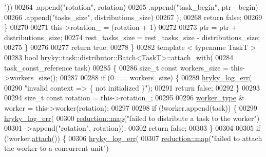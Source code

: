 \begin{DoxyCode}
{      "}))
00264                 .append(\textcolor{stringliteral}{"rotation"}, rotation)
00265                 .append(\textcolor{stringliteral}{"task\_begin"}, ptr - begin)
00266                 .append(\textcolor{stringliteral}{"tasks\_size"}, distributions\_size)
00267                 );
00268             \textcolor{keywordflow}{return} \textcolor{keyword}{false};
00269         \}
00270 
00271         this->rotation\_ = (rotation + 1) %
00272 
00273         ptr = ptr + distributions\_size;
00274         rest\_tasks\_size = rest\_tasks\_size - distributions\_size;
00275     \}
00276 
00277     \textcolor{keywordflow}{return} \textcolor{keyword}{true};
00278 \}
00282 \textcolor{keyword}{template} < \textcolor{keyword}{typename} TaskT >
\hypertarget{task__distributor__batch_8h_source_l00283}{}\hyperlink{group__task_ga54ecf037362d5f476c1cd9a984c1b720}{00283} \textcolor{keywordtype}{bool} \hyperlink{classhryky_1_1task_1_1distributor_1_1_batch}{hryky::task::distributor::Batch<TaskT>::attach_with}(
00284     task\_const\_reference task)
00285 \{
00286     \textcolor{keywordtype}{size\_t} \textcolor{keyword}{const} workers\_size = this->workers\_size();
00287 
00288     \textcolor{keywordflow}{if} (0 == workers\_size) \{
00289         \hyperlink{log__writer__common_8h_ae5ad3dabb33f594695ef40753cb78aad}{hryky_log_err}(
00290             \textcolor{stringliteral}{"invalid context => \{ not initialized \}"});
00291         \textcolor{keywordflow}{return} \textcolor{keyword}{false};
00292     \}
00293 
00294     \textcolor{keywordtype}{size\_t} \textcolor{keyword}{const} rotation = this->rotation\_;
00295 
00296     \hyperlink{classhryky_1_1task_1_1worker_1_1_base}{worker_type} & worker = this->worker(rotation);
00297 
00298     \textcolor{keywordflow}{if} (!worker.append(task)) \{
00299         \hyperlink{log__writer__common_8h_ae5ad3dabb33f594695ef40753cb78aad}{hryky_log_err}(
00300             \hyperlink{namespacehryky_1_1reduction_ac5eae270cf8047b294dc4ff3e5e11a79}{reduction::map}(\textcolor{stringliteral}{"failed to distribute a task to the worker"})
00301             ->append(\textcolor{stringliteral}{"rotation"}, rotation));
00302         \textcolor{keywordflow}{return} \textcolor{keyword}{false};
00303     \}
00304 
00305     \textcolor{keywordflow}{if} (!worker.\hyperlink{classhryky_1_1task_1_1worker_1_1_base_ae17d5723d8aa5567ea6a47b67f8133c4}{attach}()) \{
00306         \hyperlink{log__writer__common_8h_ae5ad3dabb33f594695ef40753cb78aad}{hryky_log_err}(
00307             \hyperlink{namespacehryky_1_1reduction_ac5eae270cf8047b294dc4ff3e5e11a79}{reduction::map}(\textcolor{stringliteral}{"failed to attach the worker to a concurrent unit"})

\end{DoxyCode}
